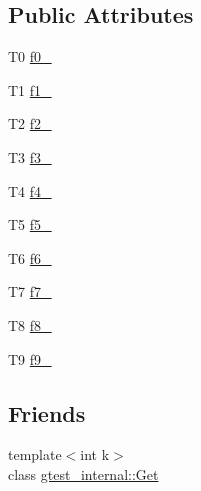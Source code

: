 \subsection*{Public Attributes}
\begin{DoxyCompactItemize}
\item 
T0 \hyperlink{singletonstd_1_1tr1_1_1tuple_a771b1d99e8800fb284acd04bca838cbb}{f0\+\_\+}
\item 
T1 \hyperlink{singletonstd_1_1tr1_1_1tuple_a7cccf899dedc626c51fa4f6921d0ac52}{f1\+\_\+}
\item 
T2 \hyperlink{singletonstd_1_1tr1_1_1tuple_aaec06c27366502dc332ef96878628f84}{f2\+\_\+}
\item 
T3 \hyperlink{singletonstd_1_1tr1_1_1tuple_ad4d3673e0d5c07c392c02e335fe978ff}{f3\+\_\+}
\item 
T4 \hyperlink{singletonstd_1_1tr1_1_1tuple_ab662f1051c2302d065796383848db6c4}{f4\+\_\+}
\item 
T5 \hyperlink{singletonstd_1_1tr1_1_1tuple_a32d8cd6f180c0a77d83733fc65423657}{f5\+\_\+}
\item 
T6 \hyperlink{singletonstd_1_1tr1_1_1tuple_a597beab3af3f95c84408491ab14632b0}{f6\+\_\+}
\item 
T7 \hyperlink{singletonstd_1_1tr1_1_1tuple_a7c28780e616d382833e844f62672c6bc}{f7\+\_\+}
\item 
T8 \hyperlink{singletonstd_1_1tr1_1_1tuple_ae859012c83943e54e035a4a32089ccb6}{f8\+\_\+}
\item 
T9 \hyperlink{singletonstd_1_1tr1_1_1tuple_a336d5e582fd34e45ec88c78d473671dd}{f9\+\_\+}
\end{DoxyCompactItemize}
\subsection*{Friends}
\begin{DoxyCompactItemize}
\item 
{\footnotesize template$<$int k$>$ }\\class \hyperlink{singletonstd_1_1tr1_1_1tuple_aeeed38755abdaa78587dd1eac9ccc950}{gtest\+\_\+internal\+::\+Get}
\end{DoxyCompactItemize}


